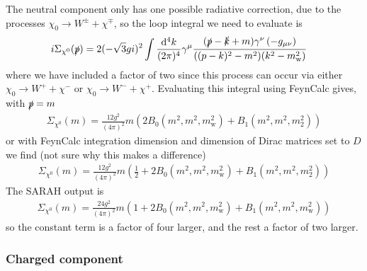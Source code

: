 \documentclass[11pt]{article}
\def\sp{\slashed{p}}
\def\cn{\chi^0}
\renewcommand{\d}{\ensuremath{\operatorname{d}\!}}
\begin{document}
The neutral component only has one possible radiative correction, due to the processes $\chi_0\rightarrow W^{\pm} + \chi^{\mp}$, so the loop integral we need to evaluate is
\begin{align}
i\Sigma_{\cn}(\slashed{p})&= 2 (-\sqrt{3}gi)^2 \int \frac{\d^4k}{(2\pi)^4} \gamma^{\mu}\frac{(\slashed{p}-\slashed{k}+m)\gamma^{\nu}\left(-g_{\mu\nu}\right)}{((p-k)^2-m^2)(k^2-m_{\text{w}}^2)}\label{eqn:cn_loop}
\end{align}
where we have included a factor of two since this process can occur via either $\chi_0\rightarrow W^+ + \chi^-$ or $\chi_0\rightarrow W^- + \chi^+$.  Evaluating this integral using FeynCalc gives, with $\sp=m$
\begin{align}
\Sigma_{\cn}(m)= \frac{12g^2}{(4\pi)^2} m \left(2B_0(m^2,m^2,m_{\text{w}}^2)+B_1(m^2,m^2,m_2^2)\right) \label{eqn:neutral_SE}
\end{align}
or with FeynCalc integration dimension and dimension of Dirac matrices set to $D$ we find (not sure why this makes a difference)
\begin{align}
\Sigma_{\cn}(m)= \frac{12g^2}{(4\pi)^2} m \left(\frac{1}{2}+2B_0(m^2,m^2,m_{\text{w}}^2)+B_1(m^2,m^2,m_2^2)\right)
\end{align}
The SARAH output is
\begin{align}
\Sigma_{\cn}(m)= \frac{24g^2}{(4\pi)^2} m \left(1+2B_0(m^2,m^2,m_{\text{w}}^2)+B_1(m^2,m^2,m_{\text{w}}^2)\right)
\end{align}
so the constant term is a factor of four larger, and the rest a factor of two larger.


\subsubsection{Charged component}
\end{document}
